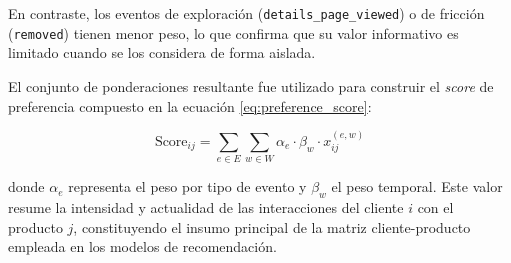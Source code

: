 En contraste, los eventos de exploración (\texttt{details\_page\_viewed}) o de fricción (\texttt{removed}) tienen menor peso, lo que confirma que su valor informativo es limitado cuando se los considera de forma aislada.  

El conjunto de ponderaciones resultante fue utilizado para construir el \textit{score} de preferencia compuesto en la ecuación \ref{eq:preference_score}:

\begin{equation}
\label{eq:preference_score}
\text{Score}_{ij} = \sum_{e \in E} \sum_{w \in W} \alpha_e \cdot \beta_w \cdot x_{ij}^{(e,w)}
\end{equation}

donde $\alpha_e$ representa el peso por tipo de evento y $\beta_w$ el peso temporal.  
Este valor resume la intensidad y actualidad de las interacciones del cliente $i$ con el producto $j$, constituyendo el insumo principal de la matriz cliente-producto empleada en los modelos de recomendación.